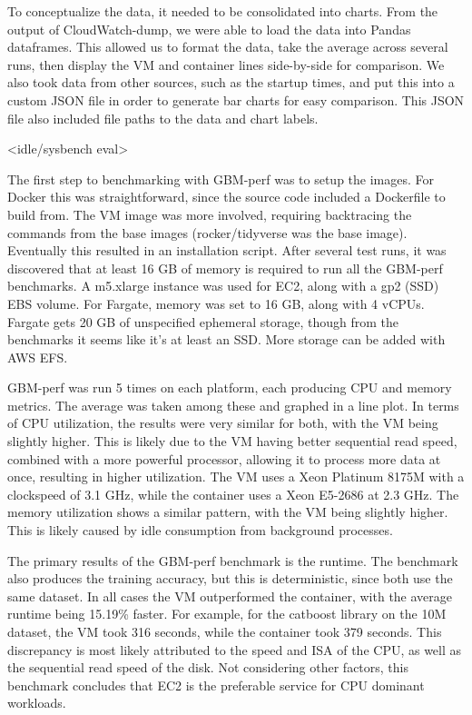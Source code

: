 \documentclass[11pt]{article}
\begin{document}
To conceptualize the data, it needed to be consolidated into charts. From the output of CloudWatch-dump, we were able to load the data into Pandas dataframes. This allowed us to format the data, take the average across several runs, then display the VM and container lines side-by-side for comparison. We also took data from other sources, such as the startup times, and put this into a custom JSON file in order to generate bar charts for easy comparison. This JSON file also included file paths to the data and chart labels.

<idle/sysbench eval>

The first step to benchmarking with GBM-perf was to setup the images. For Docker this was straightforward, since the source code included a Dockerfile to build from. The VM image was more involved, requiring backtracing the commands from the base images (rocker/tidyverse was the base image). Eventually this resulted in an installation script. After several test runs, it was discovered that at least 16 GB of memory is required to run all the GBM-perf benchmarks. A m5.xlarge instance was used for EC2, along with a gp2 (SSD) EBS volume. For Fargate, memory was set to 16 GB, along with 4 vCPUs. Fargate gets 20 GB of unspecified ephemeral storage, though from the benchmarks it seems like it's at least an SSD. More storage can be added with AWS EFS.

GBM-perf was run 5 times on each platform, each producing CPU and memory metrics. The average was taken among these and graphed in a line plot. In terms of CPU utilization, the results were very similar for both, with the VM being slightly higher. This is likely due to the VM having better sequential read speed, combined with a more powerful processor, allowing it to process more data at once, resulting in higher utilization. The VM uses a Xeon Platinum 8175M with a clockspeed of 3.1 GHz, while the container uses a Xeon E5-2686 at 2.3 GHz. The memory utilization shows a similar pattern, with the VM being slightly higher. This is likely caused by idle consumption from background processes.

The primary results of the GBM-perf benchmark is the runtime. The benchmark also produces the training accuracy, but this is deterministic, since both use the same dataset. In all cases the VM outperformed the container, with the average runtime being 15.19\% faster. For example, for the catboost library on the 10M dataset, the VM took 316 seconds, while the container took 379 seconds. This discrepancy is most likely attributed to the speed and ISA of the CPU, as well as the sequential read speed of the disk. Not considering other factors, this benchmark concludes that EC2 is the preferable service for CPU dominant workloads.
\end{document}
